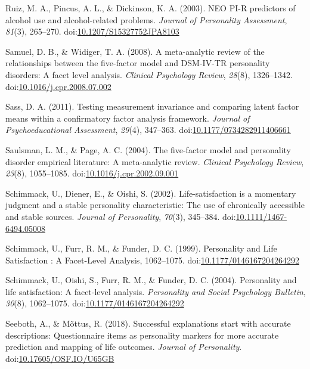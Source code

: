 \documentclass[,man,floatsintext]{apa6}
\theoremstyle{definition}
\theoremstyle{definition}
\theoremstyle{definition}
\theoremstyle{remark}
\begin{document}
\leavevmode\hypertarget{ref-Ruiz2003}{}%
Ruiz, M. A., Pincus, A. L., \& Dickinson, K. A. (2003). NEO PI-R
predictors of alcohol use and alcohol-related problems. \emph{Journal of
Personality Assessment}, \emph{81}(3), 265--270.
doi:\href{https://doi.org/10.1207/S15327752JPA8103}{10.1207/S15327752JPA8103}

\leavevmode\hypertarget{ref-SamuelWidiger2008}{}%
Samuel, D. B., \& Widiger, T. A. (2008). A meta-analytic review of the
relationships between the five-factor model and DSM-IV-TR personality
disorders: A facet level analysis. \emph{Clinical Psychology Review},
\emph{28}(8), 1326--1342.
doi:\href{https://doi.org/10.1016/j.cpr.2008.07.002}{10.1016/j.cpr.2008.07.002}

\leavevmode\hypertarget{ref-Sass2011}{}%
Sass, D. A. (2011). Testing measurement invariance and comparing latent
factor means within a confirmatory factor analysis framework.
\emph{Journal of Psychoeducational Assessment}, \emph{29}(4), 347--363.
doi:\href{https://doi.org/10.1177/0734282911406661}{10.1177/0734282911406661}

\leavevmode\hypertarget{ref-SaulsmanPage2004}{}%
Saulsman, L. M., \& Page, A. C. (2004). The five-factor model and
personality disorder empirical literature: A meta-analytic review.
\emph{Clinical Psychology Review}, \emph{23}(8), 1055--1085.
doi:\href{https://doi.org/10.1016/j.cpr.2002.09.001}{10.1016/j.cpr.2002.09.001}

\leavevmode\hypertarget{ref-Schimmack2002}{}%
Schimmack, U., Diener, E., \& Oishi, S. (2002). Life-satisfaction is a
momentary judgment and a stable personality characteristic: The use of
chronically accessible and stable sources. \emph{Journal of
Personality}, \emph{70}(3), 345--384.
doi:\href{https://doi.org/10.1111/1467-6494.05008}{10.1111/1467-6494.05008}

\leavevmode\hypertarget{ref-Schimmack1999}{}%
Schimmack, U., Furr, R. M., \& Funder, D. C. (1999). Personality and
Life Satisfaction : A Facet-Level Analysis, 1062--1075.
doi:\href{https://doi.org/10.1177/0146167204264292}{10.1177/0146167204264292}

\leavevmode\hypertarget{ref-Schimmack2004}{}%
Schimmack, U., Oishi, S., Furr, R. M., \& Funder, D. C. (2004).
Personality and life satisfaction: A facet-level analysis.
\emph{Personality and Social Psychology Bulletin}, \emph{30}(8),
1062--1075.
doi:\href{https://doi.org/10.1177/0146167204264292}{10.1177/0146167204264292}

\leavevmode\hypertarget{ref-Seeboth2018}{}%
Seeboth, A., \& Mõttus, R. (2018). Successful explanations start with
accurate descriptions: Questionnaire items as personality markers for
more accurate prediction and mapping of life outcomes. \emph{Journal of
Personality}.
doi:\href{https://doi.org/10.17605/OSF.IO/U65GB}{10.17605/OSF.IO/U65GB}
\end{document}
